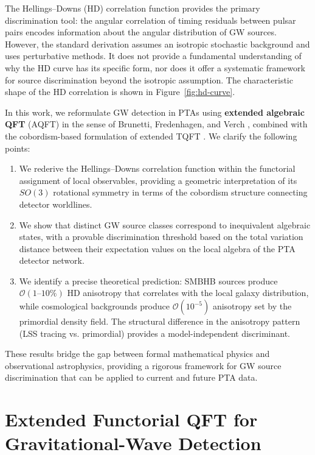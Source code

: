 \documentclass[11pt,a4paper]{article}
\begin{document}
The Hellings--Downs (HD) correlation function \cite{Hellings:1983} provides the primary discrimination tool: the angular correlation of timing residuals between pulsar pairs encodes information about the angular distribution of GW sources. However, the standard derivation assumes an isotropic stochastic background and uses perturbative methods. It does not provide a fundamental understanding of why the HD curve has its specific form, nor does it offer a systematic framework for source discrimination beyond the isotropic assumption. The characteristic shape of the HD correlation is shown in Figure~\ref{fig:hd-curve}.

In this work, we reformulate GW detection in PTAs using \textbf{extended algebraic QFT} (AQFT) in the sense of Brunetti, Fredenhagen, and Verch \cite{Brunetti:2003}, combined with the cobordism-based formulation of extended TQFT \cite{Baez:1995,Lurie:2009}. We clarify the following points:

\begin{enumerate}
\item We rederive the Hellings--Downs correlation function within the functorial assignment of local observables, providing a geometric interpretation of its $SO(3)$ rotational symmetry in terms of the cobordism structure connecting detector worldlines.
\item We show that distinct GW source classes correspond to inequivalent algebraic states, with a provable discrimination threshold based on the total variation distance between their expectation values on the local algebra of the PTA detector network.
\item We identify a precise theoretical prediction: SMBHB sources produce $\mathcal{O}(1\text{--}10\%)$ HD anisotropy that correlates with the local galaxy distribution, while cosmological backgrounds produce $\mathcal{O}(10^{-5})$ anisotropy set by the primordial density field. The structural difference in the anisotropy pattern (LSS tracing vs. primordial) provides a model-independent discriminant.
\end{enumerate}

These results bridge the gap between formal mathematical physics and observational astrophysics, providing a rigorous framework for GW source discrimination that can be applied to current and future PTA data.

\section{Extended Functorial QFT for Gravitational-Wave Detection}\label{sec:framework}
\end{document}

